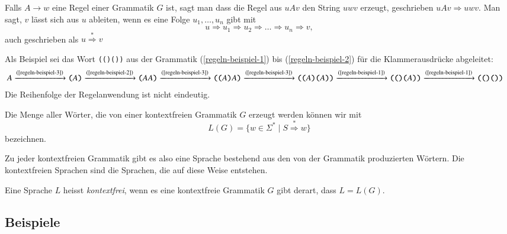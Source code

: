 \begin{definition}
%
%
Falls $A\to w$ eine Regel einer Grammatik $G$ ist, sagt man
dass die Regel aus $uAv$ den String $uwv$ erzeugt,
geschrieben $uAv\Rightarrow uwv$. Man sagt, $v$ lässt sich aus
$u$ ableiten, wenn es eine Folge $u_1,\dots,u_n$ gibt mit
\[
u\Rightarrow u_1\Rightarrow u_2\Rightarrow\dots\Rightarrow u_n\Rightarrow v,
\]
auch geschrieben als $u\overset{*}{\Rightarrow} v$
\end{definition}

\begin{beispiel}
Als Beispiel sei das Wort \texttt{(()())} aus der Grammatik
(\ref{regeln-beispiel-1})
bis
(\ref{regeln-beispiel-2})
für die Klammerausdrücke abgeleitet:
\begin{align*}
A
&\xrightarrow{\text{(\ref{regeln-beispiel-3})}} \texttt{(} A \texttt{)}
 \xrightarrow{\text{(\ref{regeln-beispiel-2})}} \texttt{(} AA \texttt{)}
 \xrightarrow{\text{(\ref{regeln-beispiel-3})}} \texttt{((} A\texttt{)}A \texttt{)}
 \xrightarrow{\text{(\ref{regeln-beispiel-3})}} \texttt{((} A\texttt{)(}A \texttt{))}
 \xrightarrow{\text{(\ref{regeln-beispiel-1})}} \texttt{((} \texttt{)(}A \texttt{))}
 \xrightarrow{\text{(\ref{regeln-beispiel-1})}} \texttt{((} \texttt{)(} \texttt{))}
\end{align*}
Die Reihenfolge der Regelanwendung ist nicht eindeutig.
\end{beispiel}

\begin{definition}
%
Die Menge aller Wörter, die von einer kontextfreien Grammatik 
$G$ erzeugt werden können wir mit
\[
L(G)=\{w\in\Sigma^*\;|\; S\overset{*}{\Rightarrow} w\}
\]
bezeichnen.
\end{definition}

Zu jeder kontextfreien Grammatik gibt es also eine Sprache bestehend aus
den von der Grammatik produzierten Wörtern.
Die kontextfreien Sprachen sind die Sprachen, die auf diese Weise entstehen.

\begin{definition}
%
%
Eine Sprache $L$ heisst {\em kontextfrei}, wenn es eine kontextfreie
Grammatik $G$ gibt derart, dass $L=L(G)$.
\end{definition}

\subsection{Beispiele}

